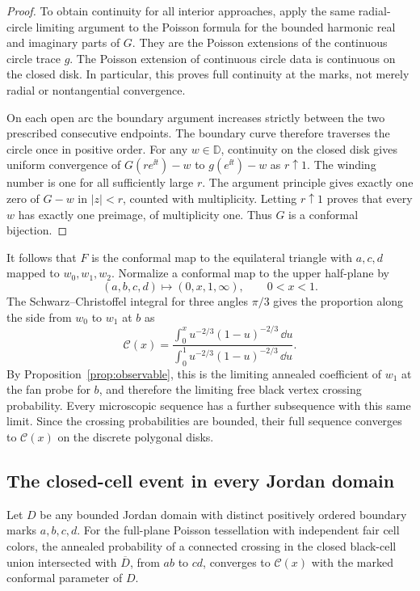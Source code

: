 \begin{proof}
To obtain continuity for all interior approaches, apply the same
radial-circle limiting argument to the Poisson formula for the bounded
harmonic real and imaginary parts of $G$. They are the Poisson
extensions of the continuous circle trace $g$. The Poisson extension of
continuous circle data is continuous on the closed disk. In particular,
this proves full continuity at the marks, not merely radial or
nontangential convergence.

On each open arc the boundary argument increases strictly between the
two prescribed consecutive endpoints. The boundary curve therefore
traverses the circle once in positive order. For any $w\in\mathbb D$,
continuity on the closed disk gives uniform convergence of
$G(re^{\ii t})-w$ to $g(e^{\ii t})-w$ as $r\uparrow1$. The winding number
is one for all sufficiently large $r$. The argument principle gives
exactly one zero of $G-w$ in $|z|<r$, counted with multiplicity. Letting
$r\uparrow1$ proves that every $w$ has exactly one preimage, of
multiplicity one. Thus $G$ is a conformal bijection.
\end{proof}

It follows that $F$ is the conformal map to the equilateral triangle with
$a,c,d$ mapped to $w_0,w_1,w_2$. Normalize a conformal map to the upper
half-plane by
\[
                  (a,b,c,d)\longmapsto(0,x,1,\infty),\qquad 0<x<1.
\]
The Schwarz--Christoffel integral for three angles $\pi/3$ gives the
proportion along the side from $w_0$ to $w_1$ at $b$ as
\begin{equation}
 \mathcal C(x)=
 \frac{\displaystyle\int_0^x u^{-2/3}(1-u)^{-2/3}\,\dd u}
      {\displaystyle\int_0^1 u^{-2/3}(1-u)^{-2/3}\,\dd u}.
 \label{observable:beta}
\end{equation}
By Proposition~\ref{prop:observable}, this is the limiting annealed
coefficient of $w_1$ at the fan probe for $b$, and therefore the limiting
free black vertex crossing probability. Every microscopic sequence has
a further subsequence with this same limit. Since the crossing
probabilities are bounded, their full sequence converges to
$\mathcal C(x)$ on the discrete polygonal disks.

\subsection{The closed-cell event in every Jordan domain}

\begin{proposition}
\label{prop:jordan-squeeze}
Let $D$ be any bounded Jordan domain with distinct positively ordered
boundary marks $a,b,c,d$. For the full-plane Poisson tessellation with
independent fair cell colors, the annealed probability of a connected
crossing in the closed black-cell union intersected with $\overline D$,
from $ab$ to $cd$, converges to $\mathcal C(x)$ with the marked conformal
parameter of $D$.
\end{proposition}

